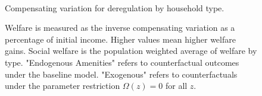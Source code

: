 \documentclass[12pt]{article}
\begin{document}
	\begin{figure}[htbp!]
		\begin{center}
		\caption{ \\ Compensating variation for deregulation by household type. }\label{figure:welfare_ctfl}
		\end{center}
		\caption*{Welfare is measured as the inverse compensating variation as a percentage of initial income. Higher values mean higher welfare gains. Social welfare is the population weighted average of welfare by type. "Endogenous Amenities" refers to counterfactual outcomes under the baseline model. "Exogenous" refers to counterfactuals under the parameter restriction $\Omega(z) = 0$ for all $z$.}
	\end{figure}
	
\end{document}
